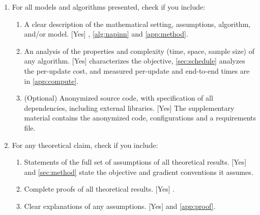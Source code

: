 \documentclass[twoside]{article}
\begin{document}
\begin{enumerate}

  \item For all models and algorithms presented, check if you include:
  \begin{enumerate}
    \item A clear description of the mathematical setting, assumptions,
    algorithm, and/or model. [Yes] , \cref{alg:napinn} and
    \cref{app:method}.
    \item An analysis of the properties and complexity (time, space, sample
    size) of any algorithm. [Yes]  characterizes the objective,
    \cref{sec:schedule} analyzes the per-update cost, and measured per-update and
    end-to-end times are in \cref{app:compute}.
    \item (Optional) Anonymized source code, with specification of all
    dependencies, including external libraries. [Yes] The supplementary
    material contains the anonymized code, configurations and a requirements
    file.
  \end{enumerate}

  \item For any theoretical claim, check if you include:
  \begin{enumerate}
    \item Statements of the full set of assumptions of all theoretical results.
    [Yes]  and \cref{sec:method} state the objective and gradient conventions it
    assumes.
    \item Complete proofs of all theoretical results. [Yes] .
    \item Clear explanations of any assumptions. [Yes]  and
    \cref{app:proof}.
  \end{enumerate}


\end{enumerate}
\end{document}
